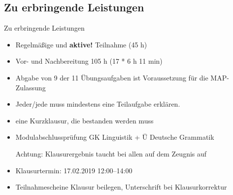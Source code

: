 %
\subsection{Zu erbringende Leistungen}

\begin{frame}{Zu erbringende Leistungen}

	\begin{itemize}
	\item Regelmäßige und \textbf{aktive!} Teilnahme (45 h)
        \item Vor- und Nachbereitung 105 h (17 * 6 h 11 min)
	\item Abgabe von 9 der 11 Übungsaufgaben ist Voraussetzung für die MAP-Zulassung
        \item Jeder/jede muss mindestens eine Teilaufgabe erklären.

        \item eine Kurzklausur, die bestanden werden muss







	\item Modulabschlussprüfung \ras GK Linguistik + Ü Deutsche Grammatik

              Achtung: Klausurergebnis taucht bei allen auf dem Zeugnis auf

        \item Klausurtermin: 17.02.2019 12:00--14:00
        \item Teilnahmescheine Klausur beilegen, Unterschrift bei Klausurkorrektur
              
	\end{itemize}
	
\end{frame}


%
